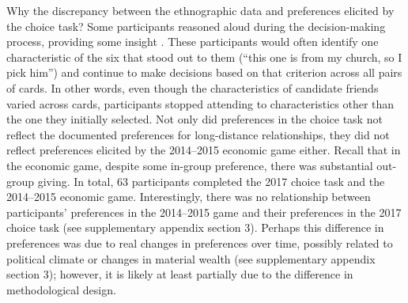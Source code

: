 \documentclass[bibauthoryear]{aa}
\begin{document}
	Why the discrepancy between the ethnographic data and preferences elicited by the choice task? Some participants reasoned aloud during the decision-making process, providing some insight \citep{bernard2017research}. These participants would often identify one characteristic of the six that stood out to them (``this one is from my church, so I pick him'') and continue to make decisions based on that criterion across all pairs of cards. In other words, even though the characteristics of candidate friends varied across cards, participants stopped attending to characteristics other than the one they initially  selected. Not only did preferences in the choice task not reflect the documented preferences for long-distance relationships,  they did not reflect preferences elicited by the 2014--2015 economic game either. Recall that in the economic game, despite some in-group preference, there was substantial out-group giving. In total, 63 participants completed the 2017 choice task and the 2014--2015 economic game. Interestingly, there was no relationship between participants' preferences in the 2014--2015 game and their preferences in the 2017 choice task (see supplementary appendix section 3). Perhaps this difference in preferences was due to real changes in preferences over time, possibly related to political climate or changes in material wealth (see supplementary appendix section 3); however, it is likely at least partially due to the difference in methodological design.
	
\end{document}
